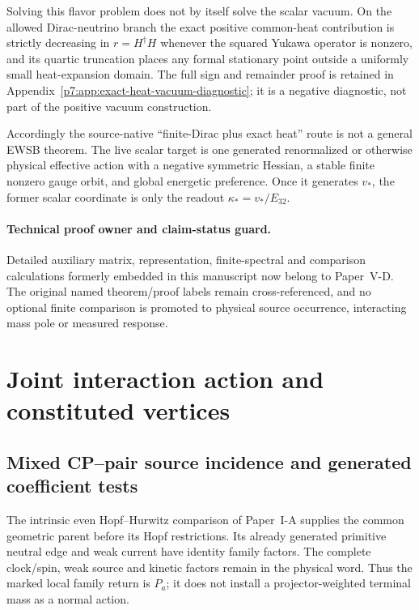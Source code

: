 \documentclass[12pt,a4paper]{article}
\begin{document}
Solving this flavor problem does not by itself solve the scalar vacuum.  On
the allowed Dirac-neutrino branch the exact positive common-heat contribution
is strictly decreasing in \(r=H^\dagger H\) whenever the squared Yukawa
operator is nonzero, and its quartic truncation places any formal stationary
point outside a uniformly small heat-expansion domain.  The full sign and
remainder proof is retained in
Appendix~\ref{p7:app:exact-heat-vacuum-diagnostic}; it is a negative diagnostic,
not part of the positive vacuum construction.

Accordingly the source-native ``finite-Dirac plus exact heat'' route is not a
general EWSB theorem.  The live scalar target is one generated renormalized or
otherwise physical effective action with a negative symmetric Hessian, a
stable finite nonzero gauge orbit, and global energetic preference.  Once it
generates $v_*$, the former scalar coordinate is only the readout
$\kappa_*=v_*/E_{32}$.



\label{p7v2:part:scope}

\paragraph{Technical proof owner and claim-status guard.}
Detailed auxiliary matrix, representation, finite-spectral and comparison
calculations formerly embedded in this manuscript now belong to
Paper~V-D. The original named theorem/proof labels remain
cross-referenced, and no optional finite comparison is promoted
to physical source occurrence, interacting mass pole or measured response.

\section{Joint interaction action and constituted vertices}
\label{p5c:sec:organized-vertices}
\subsection{Mixed CP--pair source incidence and generated coefficient tests}
\label{p5c:sec:v2167-cpbl2-source-incidence}
The intrinsic even Hopf--Hurwitz comparison of Paper~I-A supplies the
common geometric parent before its Hopf restrictions. Its already
generated primitive neutral edge and weak current have identity family
factors. The complete clock/spin, weak source and kinetic factors remain
in the physical word. Thus the marked local family return is $P_a$;
it does not install a projector-weighted terminal mass as a normal action.
\end{document}
